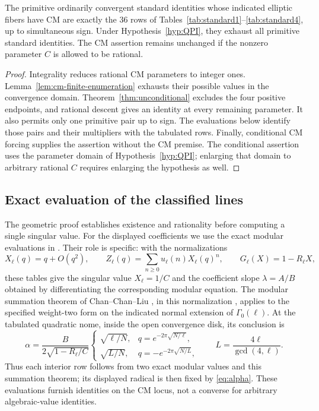 \begin{theorem}\label{thm:conditional}
The primitive ordinarily convergent standard identities whose
indicated elliptic fibers have CM are exactly the 36 rows of
Tables~\ref{tab:standard1}--\ref{tab:standard4}, up to simultaneous
sign.  Under Hypothesis~\ref{hyp:QPI}, they exhaust all primitive
standard identities.  The CM assertion remains unchanged if the
nonzero parameter $C$ is allowed to be rational.
\end{theorem}
\begin{proof}
Integrality reduces rational CM parameters to integer ones.
Lemma~\ref{lem:cm-finite-enumeration} exhausts their possible values
in the convergence domain.  Theorem~\ref{thm:unconditional}
excludes the four positive endpoints, and rational descent gives
an identity at every remaining parameter.  It also permits only
one primitive pair up to sign.  The evaluations below identify
those pairs and their multipliers with the tabulated rows.
Finally, conditional CM forcing supplies the assertion without
the CM premise.  The conditional assertion uses the parameter domain of
Hypothesis~\ref{hyp:QPI}; enlarging that domain to arbitrary
rational $C$ requires enlarging the hypothesis as well.
\end{proof}

\subsection{Exact evaluation of the classified lines}
\label{sec:standard}

The geometric proof establishes existence and rationality before
computing a single singular value.  For the displayed coefficients
we use the exact modular evaluations in
\cite[Tables~5--11]{CCY}.  Their role is specific: with the
normalizations
\[
 X_\ell(q)=q+O(q^2),\qquad
 Z_\ell(q)=\sum_{n\ge0}u_\ell(n)X_\ell(q)^n,\qquad
 G_\ell(X)=1-R_\ell X,
\]
these tables give the singular value $X_\ell=1/C$ and the
coefficient slope $\lambda=A/B$ obtained by differentiating the
corresponding modular equation.  The modular summation theorem of
Chan--Chan--Liu \cite[Theorem~2.1]{CCL}, in this normalization
\cite[Theorem~2.4]{CCY}, applies to the specified weight-two form
on the indicated normal extension of $\Gamma_0(\ell)$.  At the
tabulated quadratic nome, inside the open convergence disk, its
conclusion is
\begin{equation}\label{eq:alpha}
 \alpha=\frac{B}{2\sqrt{1-R_\ell/C}}
 \begin{cases}
   \sqrt{\ell/N},&q=e^{-2\pi\sqrt{N/\ell}},\\
   \sqrt{L/N},&q=-e^{-2\pi\sqrt{N/L}},
 \end{cases}
 \qquad L=\frac{4\ell}{\gcd(4,\ell)}.
\end{equation}
Thus each interior row follows from two exact modular values and
this summation theorem; its displayed radical is then fixed by
\eqref{eq:alpha}.  These evaluations furnish identities on the
CM locus, not a converse for arbitrary algebraic-value identities.

